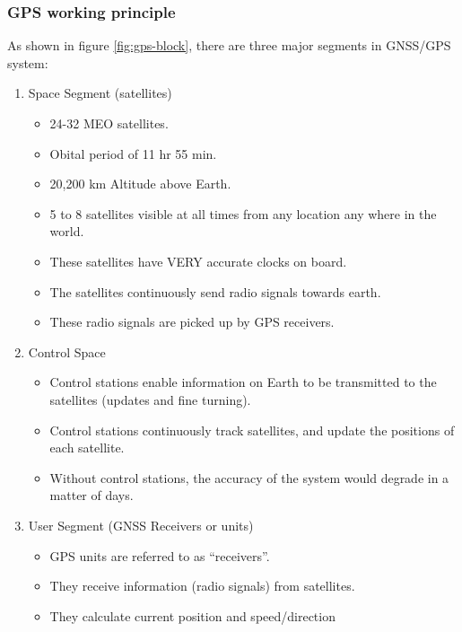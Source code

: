 \subsubsection{GPS working principle}
As shown in figure \ref{fig:gps-block}, there are three major segments in GNSS/GPS system:
\begin{enumerate}
    \item Space Segment (satellites)
    \begin{itemize}
        \item 24-32 MEO satellites.
        \item Obital period of 11 hr 55 min.
        \item 20,200 km Altitude above Earth.
        \item 5 to 8 satellites visible at all times from any
location any where in the world.
        \item These satellites have VERY accurate clocks on
board.
        \item The satellites continuously send radio signals
towards earth.
        \item These radio signals are picked up by GPS
receivers.

    \end{itemize}
    
    \item Control Space
    \begin{itemize}
        \item Control stations enable information on Earth to be
      transmitted to the satellites (updates and fine turning).
      \item Control stations continuously track satellites, and update the
positions of each satellite.
      \item Without control stations, the accuracy of the system would degrade in a matter of days.
    \end{itemize}
    
    \item User Segment (GNSS Receivers or units)
    \begin{itemize}
        \item GPS units are referred to as “receivers”.
         \item They receive information (radio signals) from satellites.
         \item They calculate current position and speed/direction
    \end{itemize}
\end{enumerate}

